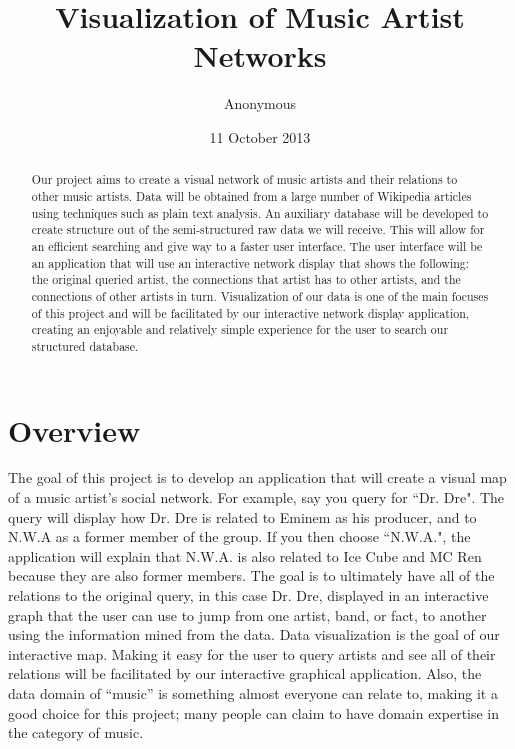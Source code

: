 \documentclass{sig-alternate}
\begin{document}
\title{Visualization of Music Artist Networks }
\author{
\alignauthor
Anonymous
}


\date{11 October 2013}
\maketitle
\begin {abstract}
Our project aims to create a visual network of music artists 
and their relations to other music artists. Data will be obtained 
from a large number of Wikipedia articles using techniques such 
as plain text analysis. An auxiliary database will be developed to 
create structure out of the semi-structured raw data we will receive. 
This will allow for an efficient searching and give way to a faster user interface. 
The user interface will be an application that will use an interactive network 
display that shows the following: the original queried artist, the 
connections that artist has to other artists, and the connections 
of other artists in turn. Visualization of our data is one of 
the main focuses of this project and will be facilitated by our
 interactive network display application, creating an enjoyable and relatively 
simple experience for the user to search our structured database.

\end{abstract}

\section{Overview}
\label{overview}
The goal of this project is to develop an application that will create 
a visual map of a music artist's social network. For example, say you query 
for ``Dr. Dre". The query will display how Dr. Dre is related to Eminem as 
his producer, and to N.W.A as a former member of the group. If you then 
choose ``N.W.A.", the application will explain that N.W.A. is also related to 
 Ice Cube and MC Ren because they are also former members. The goal is 
to ultimately have all of the relations to the original query, in this case Dr. Dre, 
displayed in an interactive graph that the user can use to jump from one 
artist, band, or fact, to another using the information mined from the data. 
Data visualization is the goal of our interactive map. Making it easy 
for the user to query artists and see all of their relations will 
be facilitated by our interactive graphical application. Also, the data domain 
of ``music'' is something almost everyone can relate to, making it 
a good choice for this project; many people can claim to have domain 
expertise in the category of music.
\end{document}
